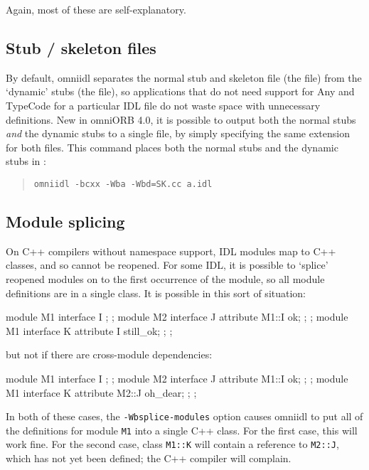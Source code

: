 \documentclass[11pt,twoside,a4paper]{book}
\newcommand{\type}[1]{\texttt{#1}}
\newcommand{\intf}[1]{\texttt{#1}}
\newcommand{\cmdline}[1]{\texttt{#1}}
\newcommand{\file}{\begingroup \urlstyle{tt}\Url}
\begin{document}
\noindent Again, most of these are self-explanatory.


\subsection{Stub / skeleton files}

By default, omniidl separates the normal stub and skeleton file (the
\file{SK.cc} file) from the `dynamic' stubs (the \file{DynSK.cc}
file), so applications that do not need support for Any and TypeCode
for a particular IDL file do not waste space with unnecessary
definitions. New in omniORB 4.0, it is possible to output both the
normal stubs \emph{and} the dynamic stubs to a single file, by simply
specifying the same extension for both files. This command places
both the normal stubs and the dynamic stubs in \file{aSK.cc}:

\begin{quote}
\cmdline{omniidl -bcxx -Wba -Wbd=SK.cc a.idl}
\end{quote}



\subsection{Module splicing}

On C++ compilers without namespace support, IDL modules map to C++
classes, and so cannot be reopened. For some IDL, it is possible to
`splice' reopened modules on to the first occurrence of the module, so
all module definitions are in a single class. It is possible in this
sort of situation:

\begin{idllisting}
module M1 {
  interface I {};
};
module M2 {
  interface J {
    attribute M1::I ok;
  };
};
module M1 {
  interface K {
    attribute I still_ok;
  };
};
\end{idllisting}

\noindent but not if there are cross-module dependencies:

\begin{idllisting}
module M1 {
  interface I {};
};
module M2 {
  interface J {
    attribute M1::I ok;
  };
};
module M1 {
  interface K {
    attribute M2::J oh_dear;
  };
};
\end{idllisting}

\noindent In both of these cases, the \cmdline{-Wbsplice-modules}
option causes omniidl to put all of the definitions for module
\intf{M1} into a single C++ class. For the first case, this will work
fine. For the second case, class \type{M1::K} will contain a reference
to \type{M2::J}, which has not yet been defined; the C++ compiler will
complain.
\end{document}
